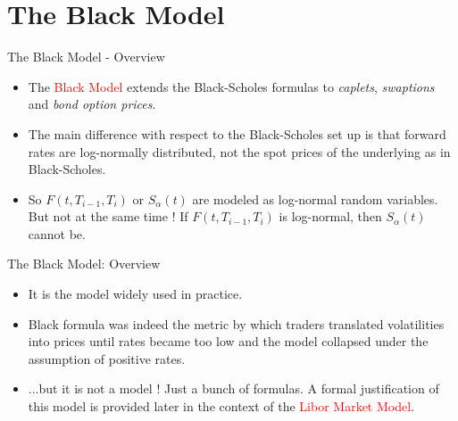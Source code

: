\documentclass{beamer}
\begin{document}
\section{The Black Model}
\begin{frame}{The Black Model - Overview}
	\begin{itemize}
		\item The \textcolor{red}{Black Model} extends the Black-Scholes formulas to \emph{caplets}, \emph{swaptions} and \emph{bond option prices}. %
		\item The main difference with respect to the Black-Scholes set up is that forward rates are log-normally distributed, not the spot prices of the underlying as in Black-Scholes.
		\item So $F(t,T_{i-1},T_i)$ or $S_\alpha(t)$ are modeled as log-normal random variables. But not at the same time ! If $F(t,T_{i-1},T_i)$ is log-normal, then $S_\alpha(t)$ cannot be.
		
	\end{itemize}
\end{frame}


\begin{frame}{The Black Model: Overview}
	\begin{itemize}
		\item It is the model widely used in practice. 
		\item Black formula was indeed the metric by which traders translated volatilities into prices until rates became too low and the model collapsed under the assumption of positive rates.
		\item ...but it is not a model ! Just a bunch of formulas.
		A formal justification of this model is provided later in the context of the \textcolor{red}{Libor Market Model}.
	\end{itemize}
\end{frame}
\end{document}
